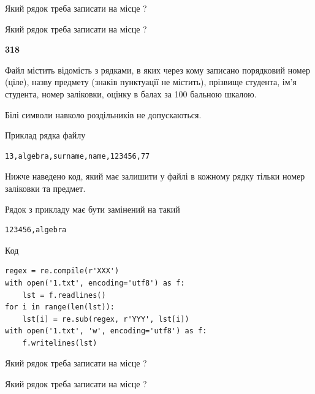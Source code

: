 Який рядок треба записати на місце  ?\par
\vspace{5mm}


Який рядок треба записати на місце  ?\par


\newpage

{\begin {center}\textbf{ 318}\end {center}}\par
Файл  містить відомість з рядками, в яких через кому записано поряд\-ковий номер (ціле), назву предмету (знаків пунктуації не містить), прізвище студента, ім'я студента, номер заліковки, оцінку в балах за 100 бальною шкалою.

Білі символи навколо роздільників не допускаються.

Приклад рядка файлу



\begin{verbatim}
13,algebra,surname,name,123456,77
\end{verbatim}


Нижче наведено код, який має залишити у файлі в кожному рядку тільки номер заліковки та предмет.

Рядок з прикладу має бути замінений на такий



\begin{verbatim}
123456,algebra
\end{verbatim}




Код



\begin{verbatim}
regex = re.compile(r'XXX')
with open('1.txt', encoding='utf8') as f:
    lst = f.readlines()
for i in range(len(lst)):
    lst[i] = re.sub(regex, r'YYY', lst[i])
with open('1.txt', 'w', encoding='utf8') as f:
    f.writelines(lst)
\end{verbatim}









Який рядок треба записати на місце  ?\par
\vspace{5mm}


Який рядок треба записати на місце  ?\par


